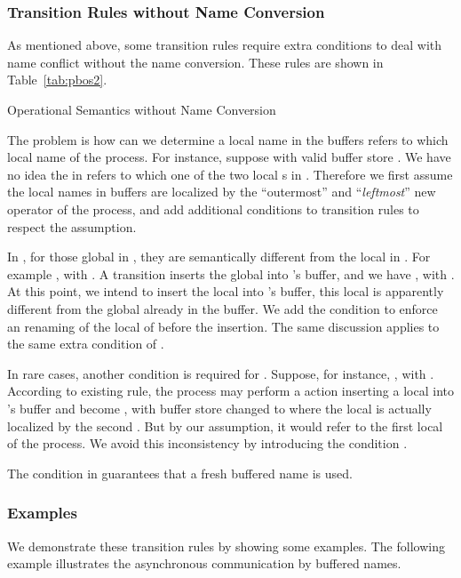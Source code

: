 \documentclass[runningheads, envcountsame, a4paper]{llncs}
\begin{document}
\subsubsection{Transition Rules without Name Conversion}
As mentioned above, some transition rules require extra conditions to deal with name conflict without the name conversion.
These rules are shown in Table~\ref{tab:pbos2}.

\begin{table}
  
  \caption{Operational Semantics without Name Conversion}
  \label{tab:pbos2}
\end{table}

The problem is how can we determine a local name in the buffers refers to which local name of the process.
For instance, suppose  with valid buffer store .
We have no idea the  in  refers to which one of the two local s in .
Therefore we first assume the local names in buffers are localized by the ``outermost'' and ``\emph{leftmost}'' new operator of the process,
and add additional conditions to transition rules to respect the assumption.

In , for those global  in , they are semantically different from the local  in .
For example , with .
A  transition inserts the global  into 's buffer, and we have , with .
At this point, we intend to insert the local  into 's buffer, this local 
is apparently different from the global  already in the buffer.
We add the condition  to enforce an renaming of the local  of  before the insertion.
The same discussion applies to the same extra condition of .

In rare cases, another condition is required for .
Suppose, for instance, , with .
According to existing  rule,
the process may perform a  action inserting a local  into 's buffer and become ,
with buffer store changed to  where the local  is actually localized by the second .
But by our assumption, it would refer to the first local  of the process.
We avoid this inconsistency by introducing the condition .

The condition  in  guarantees that
a fresh buffered name is used.


\subsubsection{Examples}

We demonstrate these transition rules by showing some examples.
The following example illustrates the asynchronous communication by buffered names.
\end{document}
